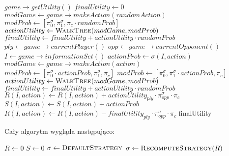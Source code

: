 \documentclass[licencjacka]{pracamgr}
\begin{document}
\begin{algorithmic}
            \State \Return $game \rightarrow getUtility()$
        \EndIf
        \State $finalUtility \gets 0$ 
                \State $modGame \gets game \rightarrow makeAction(randomAction)$
                \State $modProb \gets [\pi_0^{\sigma}, \pi_1^{\sigma}, \pi_c \cdot randomProb ]$
                \State $actionUtility \gets \Call{WalkTree}{modGame, modProb}$
                \State $finalUtility \gets finalUtility + actionUtility \cdot randomProb$
            \EndFor
        \Else
            \State $ply \gets game \rightarrow currentPlayer()$
            \State $opp \gets game \rightarrow currentOpponent()$
            \State $I \gets game \rightarrow informationSet()$
                \State $actionProb \gets \sigma(I, action)$
                \State $modGame \gets game \rightarrow makeAction(action)$
                    \State $modProb \gets [\pi_0^{\sigma} \cdot actionProb, \pi_1^{\sigma}, \pi_c]$
                \Else
                    \State $modProb \gets [\pi_0^{\sigma}, \pi_1^{\sigma} \cdot actionProb, \pi_c]$
                \EndIf
                \State $actionUtility \gets \Call{WalkTree}{modGame, modProb}$
                \State $finalUtility \gets finalUtility + actionUtility \cdot randomProb$
                \State $R(I, action) \gets R(I, action) + actionUtility_{ply} \cdot \pi_{opp}^{\sigma} \cdot \pi_c $
                \State $S(I, action) \gets S(I, action) + actionProb $
            \EndFor
                \State $R(I, action) \gets R(I, action) - finalUtility_{ply} \cdot \pi_{opp}^{\sigma} \cdot \pi_c $
            \EndFor
        \EndIf
    \State \Return finalUtility
    \EndFunction
\end{algorithmic}

$\,$ \\
\noindent
Cały algorytm wygląda następująco: \\

\begin{algorithmic}
        \State $R \gets 0$
        \State $S \gets 0$
        \State $\sigma \gets \Call{DefaultStrategy}{}$
            \State {}
            \State $\sigma \gets \Call{RecomputeStrategy}{R}$
        \EndFor
        \State \Return {}
    \EndFunction
\end{algorithmic}
\end{document}
